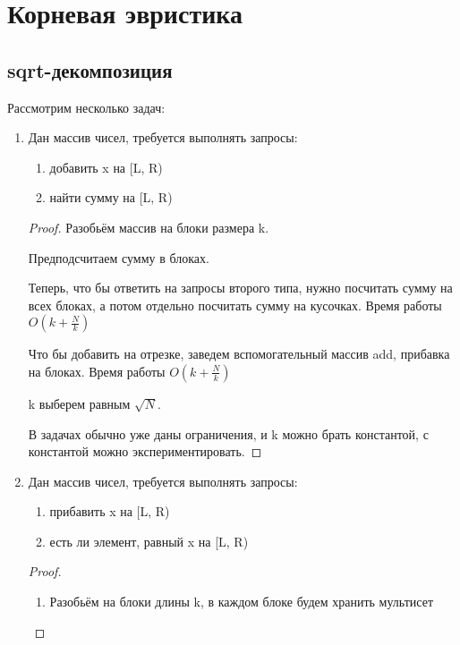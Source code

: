 \chapter{Корневая эвристика}
\section{sqrt-декомпозиция}
Рассмотрим несколько задач:
\begin{enumerate}
\item  Дан массив чисел, требуется выполнять запросы:
    \begin{enumerate}
    \item добавить x на [L, R)
    \item найти сумму на [L, R)
    \end{enumerate}
    
    \begin{proof}
    
    Разобьём массив на блоки размера k.

    Предподсчитаем сумму в блоках. 
    
    Теперь, что бы ответить на запросы второго типа, нужно посчитать сумму на всех 
    блоках, а потом отдельно посчитать сумму на кусочках. Время работы $O(k + \frac{N}{k})$

    Что бы добавить на отрезке, заведем вспомогательный массив add, прибавка на блоках. Время работы $O(k + \frac{N}{k})$

    k выберем равным $\sqrt{N}$.

    В задачах обычно уже даны ограничения, и k можно брать константой, с константой можно экспериментировать. 

    \end{proof}
\item 
    Дан массив чисел, требуется выполнять запросы:
    \begin{enumerate}
    \item прибавить x на [L, R)
    \item есть ли элемент, равный x на [L, R)
    \end{enumerate} 

    \begin{proof}
    \begin{enumerate}
    \item Разобьём на блоки длины k, в каждом блоке будем хранить мультисет


\end{enumerate}
\end{proof}
\end{enumerate}
